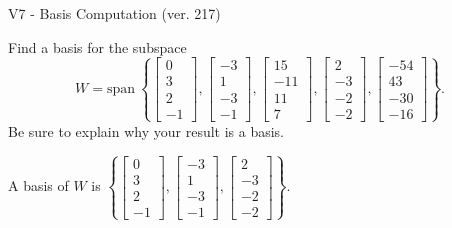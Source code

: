 \begin{exercise}
  \begin{exerciseTitle}V7 - Basis Computation (ver. 217)\end{exerciseTitle}
  \begin{exerciseStatement}
    Find a basis for the subspace 
\[W=\mathrm{span}\ \left\{\left[\begin{array}{r}
0 \\
3 \\
2 \\
-1
\end{array}\right] , \left[\begin{array}{r}
-3 \\
1 \\
-3 \\
-1
\end{array}\right] , \left[\begin{array}{r}
15 \\
-11 \\
11 \\
7
\end{array}\right] , \left[\begin{array}{r}
2 \\
-3 \\
-2 \\
-2
\end{array}\right] , \left[\begin{array}{r}
-54 \\
43 \\
-30 \\
-16
\end{array}\right]\right\}.\]
 Be sure to explain why your result is a basis.


  \end{exerciseStatement}
  \begin{exerciseAnswer}
   A basis of \(W\) is  \(\left\{\left[\begin{array}{r}
0 \\
3 \\
2 \\
-1
\end{array}\right] , \left[\begin{array}{r}
-3 \\
1 \\
-3 \\
-1
\end{array}\right] , \left[\begin{array}{r}
2 \\
-3 \\
-2 \\
-2
\end{array}\right]\right\}\).
  


  \end{exerciseAnswer}
\end{exercise}